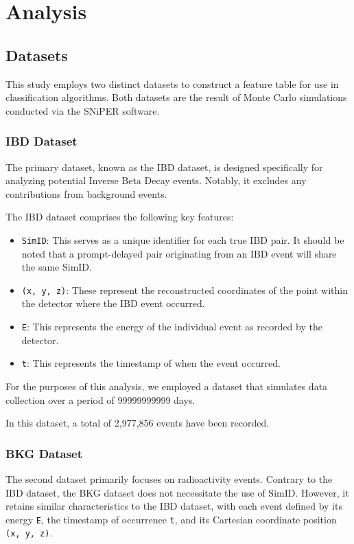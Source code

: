 \chapter{Analysis}

\section{Datasets}
This study employs two distinct datasets to construct a feature table for use in classification algorithms. Both datasets are the result of Monte Carlo simulations conducted via the SNiPER software.

\subsection*{IBD Dataset}
The primary dataset, known as the IBD dataset, is designed specifically for analyzing potential Inverse Beta Decay events. Notably, it excludes any contributions from background events.

The IBD dataset comprises the following key features:

\begin{small}
\begin{itemize}
	\item \texttt{SimID}: This serves as a unique identifier for each true IBD pair. It should be noted that a prompt-delayed pair originating from an IBD event will share the same SimID.
	\item \texttt{(x, y, z)}: These represent the reconstructed coordinates of the point within the detector where the IBD event occurred.
	\item \texttt{E}: This represents the energy of the individual event as recorded by the detector.
	\item \texttt{t}: This represents the timestamp of when the event occurred.
\end{itemize}
\end{small}

For the purposes of this analysis, we employed a dataset that simulates data collection over a period of 99999999999 days.

In this dataset, a total of 2,977,856 events have been recorded.

\subsection*{BKG Dataset}

The second dataset primarily focuses on radioactivity events. Contrary to the IBD dataset, the BKG dataset does not necessitate the use of SimID. However, it retains similar characteristics to the IBD dataset, with each event defined by its energy \texttt{E}, the timestamp of occurrence \texttt{t}, and its Cartesian coordinate position \texttt{(x, y, z)}.

